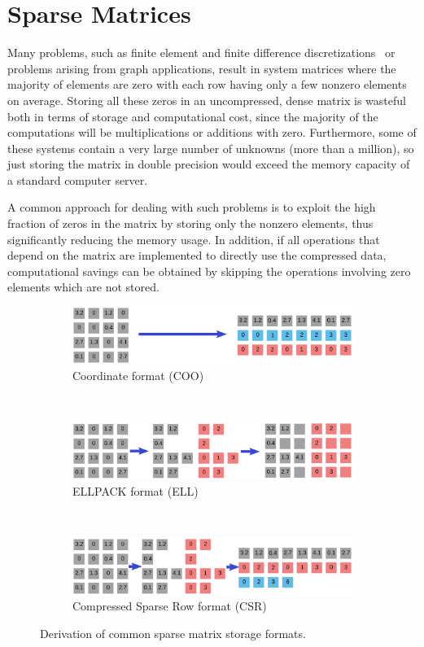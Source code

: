 \section{Sparse Matrices}
\label{introduction:sec:sparse}

Many problems, such as finite element and finite difference
discretizations~\cite{saad,duff} or problems arising from graph applications,
result in system matrices where the majority of elements are zero with
each row having only a few nonzero elements on average. Storing all these zeros
in an uncompressed, dense matrix is wasteful both in terms of storage and
computational cost, since the majority of the computations will be
multiplications or additions with zero. Furthermore, some of these systems
contain a very large number of unknowns (more than a million), so just storing
the matrix in double precision would exceed the memory capacity of a standard
computer server.

A common approach for dealing with such problems is to exploit the high fraction
of zeros in the matrix by storing only the nonzero elements, thus significantly
reducing the memory usage. In addition, if all operations that depend on the
matrix are implemented to directly use the compressed data, computational
savings can be obtained by skipping the operations involving zero elements
which are not stored.

\begin{figure}
\begin{subfigure}{\columnwidth}
\includegraphics[width=\columnwidth]{plots/coo}
\caption{Coordinate format (COO)}
\end{subfigure} \\[2em]
\begin{subfigure}{\columnwidth}
\includegraphics[width=\columnwidth]{plots/ell}
\caption{ELLPACK format (ELL)}
\end{subfigure} \\[2em]
\begin{subfigure}{\columnwidth}
\includegraphics[width=\columnwidth]{plots/csr}
\caption{Compressed Sparse Row format (CSR)}
\end{subfigure}
\caption{Derivation of common sparse matrix storage formats.}
\label{introduction:fig:sparse-formats}
\end{figure}


